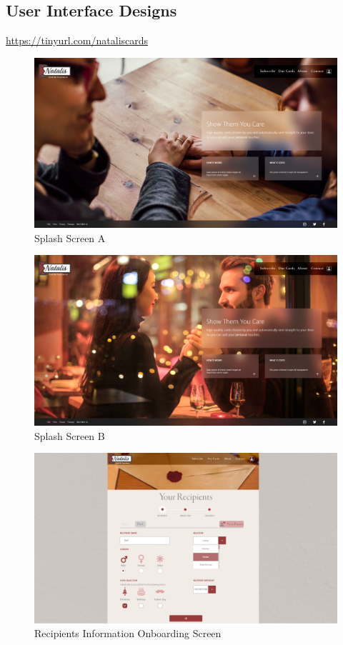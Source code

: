 \documentclass[10pt,a4paper]{article}
\begin{document}
\begin{appendices}
\clearpage

\section{User Interface Designs}
\label{sec:UI_design}
\href{https://tinyurl.com/nataliscards}{https://tinyurl.com/nataliscards}
  \begin{figure}[!htb]
\includegraphics[width=1.0\linewidth]{splash_1.png}
    \caption{Splash Screen A}
  \end{figure}

  \begin{figure}[!htb]
\includegraphics[width=1.0\linewidth]{splash_2.png}
    \caption{Splash Screen B}
  \end{figure}

  \begin{figure}[!htb]
\includegraphics[width=1.0\linewidth]{recipients.png}
    \caption{Recipients Information Onboarding Screen}
  \end{figure}


\end{appendices}
\end{document}
